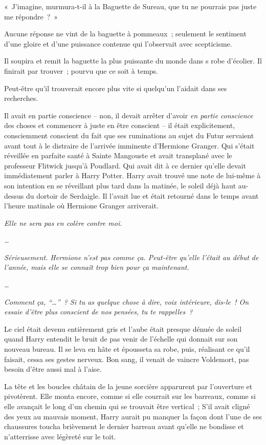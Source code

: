 «~J'imagine, murmura-t-il à la Baguette de Sureau, que tu ne pourrais pas juste me répondre~?~»

Aucune réponse ne vint de la baguette à pommeaux~; seulement le sentiment d'une gloire et d'une puissance contenue qui l'observait avec scepticisme.

Il soupira et remit la baguette la plus puissante du monde dans s robe d'écolier. Il finirait par trouver~; pourvu que ce soit à temps.

Peut-être qu'il trouverait encore plus vite si quelqu'un l'aidait dans ses recherches.

Il avait en partie conscience -- non, il devait arrêter d'avoir \emph{en partie conscience} des choses et commencer à juste en être conscient -- il était explicitement, consciemment conscient du fait que ses ruminations au sujet du Futur servaient avant tout à le distraire de l'arrivée imminente d'Hermione Granger. Qui s'était réveillée en parfaite santé à Sainte Mangouste et avait transplané avec le professeur Flitwick jusqu'à Poudlard. Qui avait dit à ce dernier qu'elle devait immédiatement parler à Harry Potter. Harry avait trouvé une note de lui-même à son intention en se réveillant plus tard dans la matinée, le soleil déjà haut au-dessus du dortoir de Serdaigle. Il l'avait lue et était retourné dans le temps avant l'heure matinale où Hermione Granger arriverait.

\emph{Elle ne sera pas en colère contre moi.}

\emph{…}

\emph{Sérieusement. Hermione n'est pas comme ça. Peut-être qu'elle l'était au début de l'année, mais elle se connaît trop bien pour ça maintenant.}

\emph{…}

\emph{Comment ça, “…”~? Si tu as quelque chose à dire, voix intérieure, dis-le~! On essaie d'être plus conscient de nos pensées, tu te rappelles~?}

\later

Le ciel était devenu entièrement gris et l'aube était presque dénuée de soleil quand Harry entendit le bruit de pas venir de l'échelle qui donnait sur son nouveau bureau. Il se leva en hâte et épousseta sa robe, puis, réalisant ce qu'il faisait, cessa ses gestes nerveux. Bon sang, il venait de vaincre Voldemort, pas besoin d'être aussi mal à l'aise.

La tête et les boucles châtain de la jeune sorcière apparurent par l'ouverture et pivotèrent. Elle monta encore, comme si elle courrait sur les barreaux, comme si elle avançait le long d'un chemin qui se trouvait être vertical~; S'il avait cligné des yeux au mauvais moment, Harry aurait pu manquer la façon dont l'une de ses chaussures toucha brièvement le dernier barreau avant qu'elle ne bondisse et n'atterrisse avec légèreté sur le toit.

